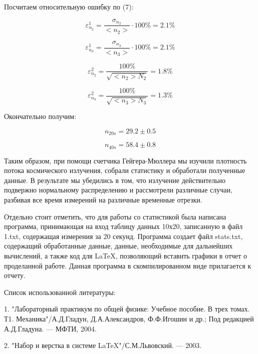 \documentclass[14pt]{article}
\begin{document}
Посчитаем относительную ошибку по (7):

$$\varepsilon_{n_2}^1 = \frac{\sigma_{n_2}}{<n_2>} \cdot 100\% = 2.1\%$$

$$\varepsilon_{n_3}^1 = \frac{\sigma_{n_3}}{<n_3>} \cdot 100\% = 2.1\%$$

$$\varepsilon_{n_2}^2 = \frac{100\%}{\sqrt{<n_2>N_2}} = 1.8\%$$

$$\varepsilon_{n_3}^2 = \frac{100\%}{\sqrt{<n_3>N_3}} = 1.3\%$$

\vspace{1cm}
Окончательно получим:

$$n_{20s} = 29.2 \pm 0.5$$

$$n_{40s} = 58.4 \pm 0.8$$

\vspace{1cm}
Таким образом, при помощи счетчика Гейгера-Мюллера мы изучили плотность потока космического излучения, собрали статистику и обработали полученные данные. В результате мы убедились в том, что излучение действительно подвержно нормальному распределению и рассмотрели различные случаи, разбивая все время измерений на различные временные отрезки.

\newpage
Отдельно стоит отметить, что для работы со статистикой была написана программа, принимающая на вход таблицу данных 10х20, записанную в файл 1.txt, содержащая измерения за 20 секунд. Программа создает файл stats.txt, содержащий обработанные данные, данные, необходимые для дальнейших вычислений, а также код для LaTeX, позволяющий вставить графики в отчет о проделанной работе. Данная программа в скомпилированном виде прилагается к отчету. 

\newpage
Список использованной литературы:
	
\vspace{0.5cm}
1. "Лабораторный практикум по общей физике: Учебное пособие. В трех томах. Т1. Механика"/А.Д.Гладун, Д.А.Александров,
Ф.Ф.Игошин и др.; Под редакцией А.Д.Гладуна. --- МФТИ, 2004.
	
2. "Набор и верстка в системе \LaTeX "/С.М.Львовский. --- 2003.
\end{document}
